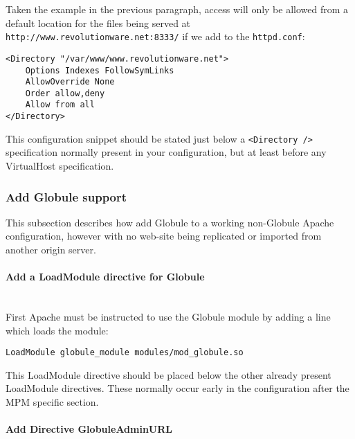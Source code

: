 \documentclass[10pt,a4paper]{article}
\makeatletter
\newenvironment{p}{\@open{P}{}}{\@close{P}}
\newenvironment{p}{}{\par}
\makeatother
\begin{document}
\begin{p}
Taken the example in the previous paragraph, access will only be allowed from a
default location for the files being served at
\texttt{http://www.revolutionware.net:8333/} if we add to the
\verb!httpd.conf!:
\end{p}

\begin{Verbatim}
<Directory "/var/www/www.revolutionware.net">
    Options Indexes FollowSymLinks
    AllowOverride None
    Order allow,deny
    Allow from all
</Directory>
\end{Verbatim}

\begin{p}
This configuration snippet should be stated just below a \texttt{<Directory
/>} specification normally present in your configuration, but at least before
any VirtualHost specification.
\end{p}

\subsubsection{Add Globule support}

\begin{p}
This subsection describes how add Globule to a working non-Globule Apache
configuration, however with no web-site being replicated or imported from
another origin server.
\end{p}

\paragraph{Add a \textbf{LoadModule} directive for Globule}~\\

\begin{p}
First Apache must be instructed to use the Globule module by adding a line
which loads the module:
\end{p}

\begin{Verbatim}
LoadModule globule_module modules/mod_globule.so
\end{Verbatim}

\begin{p}
This LoadModule directive should be placed below the other already present
LoadModule directives.  These normally occur early in the configuration after
the MPM specific section.
\end{p}

\paragraph{Add Directive \textbf{GlobuleAdminURL}}~\\
\end{document}

